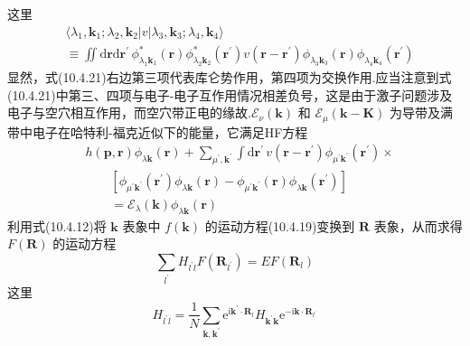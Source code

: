 这里
\begin{equation}
\begin{aligned}
  &\langle\lambda_{1},\boldsymbol{k}_{1};\lambda_{2},\boldsymbol{k}_{2}|v|
  \lambda_{3},\boldsymbol{k}_{3};\lambda_{4},\boldsymbol{k}_{4}\rangle\\
  &\equiv\iint\mathrm{d}\boldsymbol{r}\mathrm{d}\boldsymbol{r}^{\prime}\,
  \phi_{\lambda_{1}\boldsymbol{k}_{1}}^{*}(\boldsymbol{r})
  \phi_{\lambda_{2}\boldsymbol{k}_{2}}^{*}(\boldsymbol{r}^{\prime})
  v(\boldsymbol{r}-\boldsymbol{r}^{\prime})
  \phi_{\lambda_{3}\boldsymbol{k}_{3}}(\boldsymbol{r})
  \phi_{\lambda_{4}\boldsymbol{k}_{4}}(\boldsymbol{r}^{\prime})
\end{aligned}
\end{equation}
显然，式(10.4.21)右边第三项代表库仑势作用，第四项为交换作用.应当注意到式(10.4.21)中第三、四项与电子-电子互作用情况相差负号，这是由于激子问题涉及电子与空穴相互作用，而空穴带正电的缘故.$\mathscr{E}_{\nu}(\boldsymbol{k})$ 和 $\mathscr{E}_{\mu}(\boldsymbol{k}-\boldsymbol{K})$ 为导带及满带中电子在哈特利-福克近似下的能量，它满足HF方程
\begin{equation}
\begin{aligned}
  &h(\boldsymbol{p},\boldsymbol{r})\phi_{\lambda\boldsymbol{k}}(\boldsymbol{r})
  +\sum_{\mu^{\prime},\boldsymbol{k}^{\prime}}\int\mathrm{d}\boldsymbol{r}^{\prime}\,
  v(\boldsymbol{r}-\boldsymbol{r}^{\prime})\phi_{\mu^{\prime}\boldsymbol{k}^{\prime}}(\boldsymbol{r}^{\prime})
  \times\\
  &\qquad\left[\phi_{\mu^{\prime}\boldsymbol{k}^{\prime}}(\boldsymbol{r}^{\prime})\phi_{\lambda\boldsymbol{k}}(\boldsymbol{r})
  -\phi_{\mu^{\prime}\boldsymbol{k}^{\prime}}(\boldsymbol{r})\phi_{\lambda\boldsymbol{k}}(\boldsymbol{r}^{\prime})\right]\\
  &\qquad=\mathscr{E}_{\lambda}(\boldsymbol{k})\phi_{\lambda\boldsymbol{k}}(\boldsymbol{r})
\end{aligned}
\end{equation}
利用式(10.4.12)将 $\boldsymbol{k}$ 表象中 $f(\boldsymbol{k})$ 的运动方程(10.4.19)变换到 $\boldsymbol{R}$ 表象，从而求得 $F(\boldsymbol{R})$ 的运动方程
\begin{equation}
  \sum_{l^{\prime}}H_{l^{\prime}l}F(\boldsymbol{R}_{l^{\prime}})=EF(\boldsymbol{R}_{l})
\end{equation}
这里
\begin{equation}
  H_{l^{\prime}l}=\frac{1}{N}\sum_{\boldsymbol{k},\boldsymbol{k}^{\prime}}
  \mathrm{e}^{\mathrm{i}\boldsymbol{k}^{\prime}\cdot\boldsymbol{R}_{l}}H_{\boldsymbol{k}^{\prime}\boldsymbol{k}}
  \mathrm{e}^{-\mathrm{i}\boldsymbol{k}\cdot\boldsymbol{R}_{l^{\prime}}}
\end{equation}
